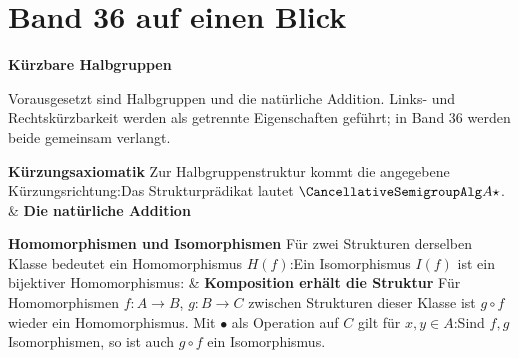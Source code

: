 \chapter[Band 36: Kürzbare Halbgruppen]{Band 36 auf einen Blick}
\noindent\textbf{Kürzbare Halbgruppen}\par\medskip
Vorausgesetzt sind Halbgruppen und die natürliche Addition.
Links- und Rechtskürzbarkeit werden als getrennte Eigenschaften geführt;
in Band 36 werden beide gemeinsam verlangt.

\begin{BandUebersicht}
\textbf{Kürzungsaxiomatik}
Zur Halbgruppenstruktur kommt die angegebene Kürzungsrichtung:Das Strukturprädikat lautet \(\CancellativeSemigroupAlg A\star\).
&
\textbf{Die natürliche Addition}
 \\
\addlinespace[.8ex]

\textbf{Homomorphismen und Isomorphismen}
Für zwei Strukturen derselben Klasse bedeutet ein Homomorphismus
\(H(f)\):Ein Isomorphismus \(I(f)\) ist ein bijektiver Homomorphismus:
&
\textbf{Komposition erhält die Struktur}
Für Homomorphismen \(f:A\to B\), \(g:B\to C\) zwischen
Strukturen dieser Klasse ist \(g\circ f\) wieder ein Homomorphismus.
Mit \(\bullet\) als Operation auf \(C\) gilt für \(x,y\in A\):Sind \(f,g\) Isomorphismen, so ist auch \(g\circ f\) ein Isomorphismus.
 \\
\addlinespace[.8ex]
\end{BandUebersicht}

